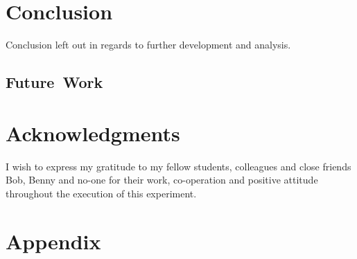 \documentclass[fleqn,10pt]{SelfArx} %
\newlength{\tocsep}
\begin{document}


\section{Conclusion}
\label{sec:conclusion}
Conclusion left out in regards to further development and analysis.

\subsection{Future~Work}
\label{sec:conclusion:futurework}

\section*{Acknowledgments} %
\label{sec:acknowledgments}
I wish to express my gratitude to my fellow students, colleagues and close friends Bob, Benny and no-one for their work, co-operation and positive attitude throughout the execution of this experiment. 

\section*{Appendix}
\label{sec:appendix}
\end{document}
